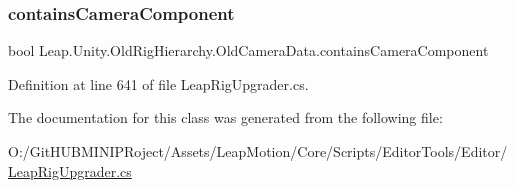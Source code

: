 \subsubsection{\texorpdfstring{containsCameraComponent}{containsCameraComponent}}
{\footnotesize\ttfamily bool Leap.\+Unity.\+Old\+Rig\+Hierarchy.\+Old\+Camera\+Data.\+contains\+Camera\+Component\hspace{0.3cm}{\ttfamily [get]}}



Definition at line 641 of file Leap\+Rig\+Upgrader.\+cs.



The documentation for this class was generated from the following file\+:\begin{DoxyCompactItemize}
\item 
O\+:/\+Git\+H\+U\+B\+M\+I\+N\+I\+P\+Roject/\+Assets/\+Leap\+Motion/\+Core/\+Scripts/\+Editor\+Tools/\+Editor/\mbox{\hyperlink{_leap_rig_upgrader_8cs}{Leap\+Rig\+Upgrader.\+cs}}\end{DoxyCompactItemize}
